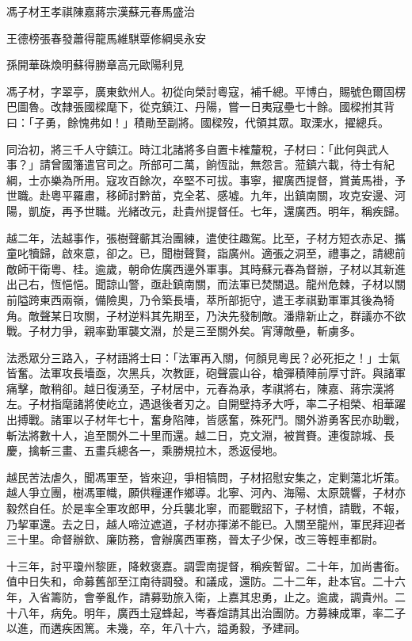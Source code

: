 
\begin{pinyinscope}
馮子材王孝祺陳嘉蔣宗漢蘇元春馬盛治

王德榜張春發蕭得龍馬維騏覃修綱吳永安

孫開華硃煥明蘇得勝章高元歐陽利見

馮子材，字翠亭，廣東欽州人。初從向榮討粵寇，補千總。平博白，賜號色爾固楞巴圖魯。改隸張國樑麾下，從克鎮江、丹陽，嘗一日夷寇壘七十餘。國樑拊其背曰：「子勇，餘愧弗如！」積勛至副將。國樑歿，代領其眾。取溧水，擢總兵。

同治初，將三千人守鎮江。時江北諸將多自置卡榷釐稅，子材曰：「此何與武人事？」請曾國籓遣官司之。所部可二萬，餉恆詘，無怨言。蒞鎮六載，待士有紀綱，士亦樂為所用。寇攻百餘次，卒堅不可拔。事寧，擢廣西提督，賞黃馬褂，予世職。赴粵平羅肅，移師討黔苗，克全茗、感墟。九年，出鎮南關，攻克安邊、河陽，凱旋，再予世職。光緒改元，赴貴州提督任。七年，還廣西。明年，稱疾歸。

越二年，法越事作，張樹聲蘄其治團練，遣使往趣駕。比至，子材方短衣赤足、攜童叱犢歸，啟來意，卻之。已，聞樹聲賢，詣廣州。適張之洞至，禮事之，請總前敵師干衛粵、桂。逾歲，朝命佐廣西邊外軍事。其時蘇元春為督辦，子材以其新進出己右，恆悒悒。聞諒山警，亟赴鎮南關，而法軍已焚關退。龍州危棘，子材以關前隘跨東西兩嶺，備險奧，乃令築長墻，萃所部扼守，遣王孝祺勤軍軍其後為犄角。敵聲某日攻關，子材逆料其先期至，乃決先發制敵。潘鼎新止之，群議亦不欲戰。子材力爭，親率勤軍襲文淵，於是三至關外矣。宵薄敵壘，斬虜多。

法悉眾分三路入，子材語將士曰：「法軍再入關，何顏見粵民？必死拒之！」士氣皆奮。法軍攻長墻亟，次黑兵，次教匪，砲聲震山谷，槍彈積陣前厚寸許。與諸軍痛擊，敵稍卻。越日復湧至，子材居中，元春為承，孝祺將右，陳嘉、蔣宗漢將左。子材指麾諸將使屹立，遇退後者刃之。自開壁持矛大呼，率二子相榮、相華躍出搏戰。諸軍以子材年七十，奮身陷陣，皆感奮，殊死鬥。關外游勇客民亦助戰，斬法將數十人，追至關外二十里而還。越二日，克文淵，被賞賚。連復諒城、長慶，擒斬三畫、五畫兵總各一，乘勝規拉木，悉返侵地。

越民苦法虐久，聞馮軍至，皆來迎，爭相犒問，子材招慰安集之，定剿蕩北圻策。越人爭立團，樹馮軍幟，願供糧運作鄉導。北寧、河內、海陽、太原競響，子材亦毅然自任。於是率全軍攻郎甲，分兵襲北寧，而罷戰詔下，子材憤，請戰，不報，乃挈軍還。去之日，越人啼泣遮道，子材亦揮涕不能已。入關至龍州，軍民拜迎者三十里。命督辦欽、廉防務，會辦廣西軍務，晉太子少保，改三等輕車都尉。

十三年，討平瓊州黎匪，降敕褒嘉。調雲南提督，稱疾暫留。二十年，加尚書銜。值中日失和，命募舊部至江南待調發。和議成，還防。二十二年，赴本官。二十六年，入省籌防，會拳亂作，請募勁旅入衛，上嘉其忠勇，止之。逾歲，調貴州。二十八年，病免。明年，廣西土寇蜂起，岑春煊請其出治團防。方募練成軍，率二子以進，而遘疾困篤。未幾，卒，年八十六，謚勇毅，予建祠。


\end{pinyinscope}
